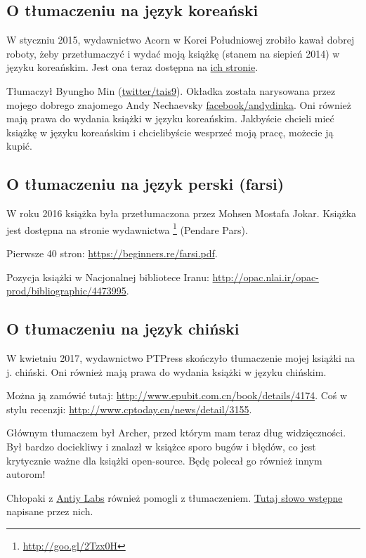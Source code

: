 



\subsection*{O tłumaczeniu na język koreański}

W styczniu 2015, wydawnictwo Acorn w Korei Południowej zrobiło kawał dobrej roboty, żeby przetłumaczyć i wydać moją książkę  (stanem na siepień 2014) w języku koreańskim.
Jest ona teraz dostępna na \href{http://go.yurichev.com/17343}{ich stronie}.

Tłumaczył Byungho Min (\href{http://go.yurichev.com/17344}{twitter/tais9}).
Okładka została narysowana przez mojego dobrego znajomego Andy Nechaevsky
\href{http://go.yurichev.com/17023}{facebook/andydinka}.
Oni również mają prawa do wydania książki w języku koreańskim.
Jakbyście chcieli mieć  książkę w języku koreańskim i chcielibyście wesprzeć moją pracę, możecie ją kupić.

\subsection*{O tłumaczeniu na język perski (farsi)}

W roku 2016 książka była przetłumaczona przez Mohsen Mostafa Jokar.
Książka jest dostępna na stronie wydawnictwa \footnote{\url{http://goo.gl/2Tzx0H}} (Pendare Pars).

Pierwsze 40 stron: \url{https://beginners.re/farsi.pdf}.

Pozycja książki w Nacjonalnej bibliotece Iranu: \url{http://opac.nlai.ir/opac-prod/bibliographic/4473995}.

\subsection*{O tłumaczeniu na język chiński}

W kwietniu 2017, wydawnictwo PTPress skończyło tłumaczenie mojej książki na j. chiński. Oni również mają prawa do wydania książki w języku chińskim.

Można ją zamówić tutaj: \url{http://www.epubit.com.cn/book/details/4174}. Coś w stylu recenzji: \url{http://www.cptoday.cn/news/detail/3155}.

Głównym tłumaczem był Archer, przed którym mam teraz dług widzięczności.
Był bardzo dociekliwy i znalazł w książce sporo bugów i błędów, co jest krytycznie ważne dla książki open-source.
Będę polecał go również innym autorom!

Chłopaki z \href{http://www.antiy.net/}{Antiy Labs} również pomogli z tłumaczeniem. \href{http://www.epubit.com.cn/book/onlinechapter/51413}{Tutaj słowo wstępne} napisane przez nich.


